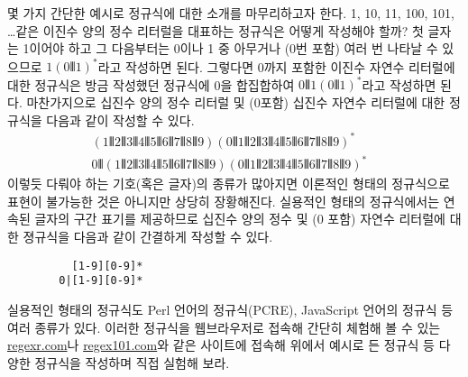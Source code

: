 몇 가지 간단한 예시로 정규식에 대한 소개를 마무리하고자 한다.
1, 10, 11, 100, 101, \ldots 같은 이진수 양의 정수 리터럴을
대표하는 정규식은 어떻게 작성해야 할까? 첫 글자는 1이어야 하고
그 다음부터는 0이나 1 중 아무거나 (0번 포함) 여러 번 나타날 수
있으므로 $1(0\VERT{}1)^{*}$라고 작성하면 된다. 그렇다면 0까지 포함한
이진수 자연수 리터럴에 대한 정규식은 방금 작성했던 정규식에
0을 합집합하여 $0\VERT{}1(0\VERT{}1)^{*}$라고 작성하면 된다.
마찬가지으로 십진수 양의 정수 리터럴 및 (0포함)
십진수 자연수 리터럴에 대한 정규식을 다음과 같이 작성할 수 있다.
\vspace*{-1ex}
\begin{align*}
(1\VERT 2\VERT 3\VERT 4\VERT 5\VERT 6\VERT 7\VERT 8\VERT 9)
 (0\VERT 1\VERT 2\VERT 3\VERT 4\VERT 5\VERT 6\VERT 7\VERT 8\VERT 9)^{*} &
\\
0\VERT
 (1\VERT 2\VERT 3\VERT 4\VERT 5\VERT 6\VERT 7\VERT 8\VERT 9)
 (0\VERT 1\VERT 2\VERT 3\VERT 4\VERT 5\VERT 6\VERT 7\VERT 8\VERT 9)^{*} &
\end{align*}
이렇듯 다뤄야 하는 기호(혹은 글자)의 종류가 많아지면 이론적인 형태의
정규식으로 표현이 불가능한 것은 아니지만 상당히 장황해진다.
실용적인 형태의 정규식에서는 연속된 글자의 구간 표기를 제공하므로
십진수 양의 정수 및 (0 포함) 자연수 리터럴에 대한 졍규식을
다음과 같이 간결하게 작성할 수 있다.
\begin{verbatim}
          [1-9][0-9]*
        0|[1-9][0-9]*
\end{verbatim}
실용적인 형태의 정규식도 Perl 언어의 정규식(PCRE),
JavaScript 언어의 정규식 등 여러 종류가 있다.
이러한 정규식을 웹브라우저로 접속해 간단히 체험해 볼 수 있는
\href{https://regexr.com/}{regexr.com}나
\href{https://regex101.com/}{regex101.com}와 같은 사이트에 접속해
위에서 예시로 든 정규식 등 다양한 정규식을 작성하며 직접 실험해 보라.

